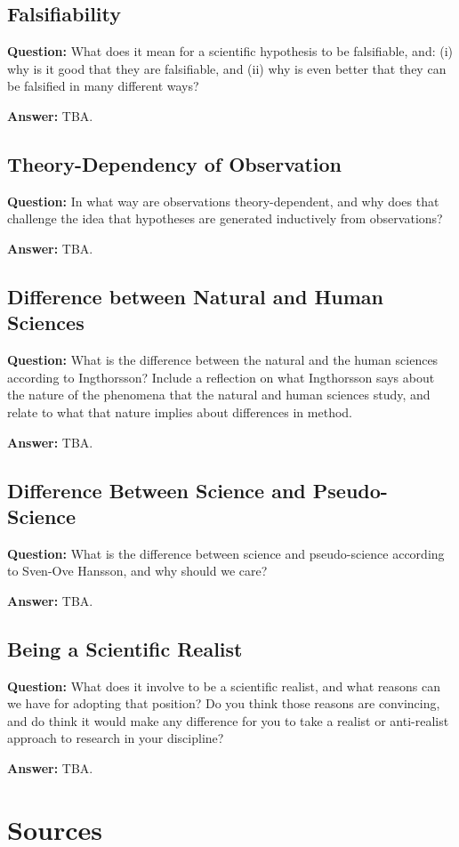 \documentclass[11pt]{scrartcl}
\begin{document}
\subsection{Falsifiability}

\textbf{Question:} What does it mean for a scientific hypothesis to be falsifiable, and: (i) why is it good that they are falsifiable, and (ii) why is even better that they can be falsified in many different ways?

\bigbreak

\textbf{Answer:} TBA.

\subsection{Theory-Dependency of Observation}

\textbf{Question:} In what way are observations theory-dependent, and why does that challenge the idea that hypotheses are generated inductively from observations?

\bigbreak

\textbf{Answer:} TBA.

\subsection{Difference between Natural and Human Sciences}

\textbf{Question:} What is the difference between the natural and the human sciences according to Ingthorsson? Include a reflection on what Ingthorsson says about the nature of the phenomena that the natural and human sciences study, and relate to what that nature implies about differences in method.

\bigbreak

\textbf{Answer:} TBA.

\subsection{Difference Between Science and Pseudo-Science}

\textbf{Question:} What is the difference between science and pseudo-science according to Sven-Ove Hansson, and why should we care?

\bigbreak

\textbf{Answer:} TBA.

\subsection{Being a Scientific Realist}

\textbf{Question:} What does it involve to be a scientific realist, and what reasons can we have for adopting that position? Do you think those reasons are convincing, and do think it would make any difference for you to take a realist or anti-realist approach to research in your discipline?

\bigbreak

\textbf{Answer:} TBA.

\section{Sources}



\end{document}
